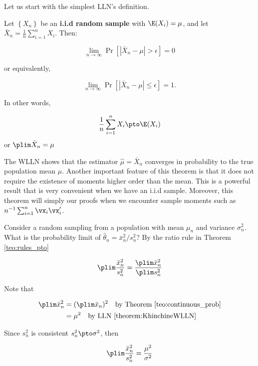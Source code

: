 \documentclass[english,12pt]{book}\usepackage[]{graphicx}\usepackage[]{xcolor}
\begin{document}
Let us start with the simplest LLN's definition. 

\begin{theorem}\label{theorem:KhinchineWLLN}
	Let $\left\lbrace X_n\right\rbrace $ be an \textbf{i.i.d random sample} with $\E(X_i)=\mu$, and let $\bar{X}_n=\frac{1}{n}\sum_{i=1}^nX_i$. Then:
	
	\begin{equation*}
	\lim_{n\to \infty}\Pr\left[\left|\bar{X}_n-\mu\right|>\epsilon \right]=0
	\end{equation*} 
	
	or equivalently,
	
	\begin{equation*}
	\lim_{n\to \infty}\Pr\left[\left|\bar{X}_n-\mu\right|\leq \epsilon \right]=1.
	\end{equation*} 
	
	In other words,
	
	\begin{equation*}
	\frac{1}{n}\sum_{i=1}^nX_i\pto \E(X_i)
	\end{equation*}
%
	or  $\plim \bar{X}_n=\mu$
\end{theorem}

The WLLN shows that the estimator $\hat{\mu}=\bar{X}_n$ converges in probability to the true population mean $\mu$. Another important feature of this theorem is that it does not require the existence of moments higher order than the mean. This is a powerful result that is very convenient when we have an i.i.d sample. Moreover, this theorem will simply our proofs when we encounter sample moments such as $n^{-1}\sum_{i = 1}^n\vx_i\vx_i'$.

\begin{example}
Consider a random sampling from a population with mean $\mu_n$ and variance $\sigma_n^2$. What is the probability limit of $\widehat{\theta}_n = \bar{x}^2_n / s^2_n$? By the ratio rule in Theorem \ref{teo:rules_pto}

\begin{equation*}
  \plim \frac{\bar{x}^2_n}{s^2_n} = \frac{\plim \bar{x}^2_n}{\plim s^2_n}
\end{equation*}

Note that

\begin{equation*}
  \begin{aligned}
  \plim \bar{x}^2_n & = (\plim \bar{x}_n)^2 \quad \mbox{by Theorem \ref{teo:continuous_prob}}\\
                    & = \mu^2 \quad \mbox{by LLN \ref{theorem:KhinchineWLLN}}
  \end{aligned}
\end{equation*}

  Since $s^2_n$ is consistent $s^2_n\pto\sigma^2$, then
  
\begin{equation*}
  \plim \frac{\bar{x}^2_n}{s^2_n} = \frac{\mu^2}{\sigma^2}
\end{equation*}
\end{example}
\end{document}
